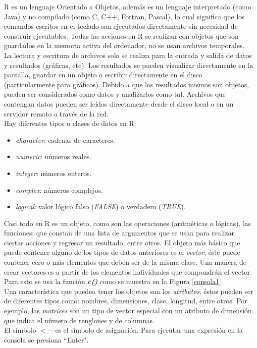 R es un lenguaje Orientado a Objetos, además es un lenguaje interpretado (como Java) y no compilado (como C, C++, Fortran, Pascal), lo cual significa que los comandos escritos en el teclado son ejecutados directamente sin necesidad de construir ejecutables. Todas las acciones en R se realizan con objetos que son guardados en la memoria activa del ordenador, no se usan archivos temporales\cite{principiantes}. La lectura y escritura de archivos solo se realiza para la entrada y salida de datos y resultados (gráficas, etc). Los resultados se pueden visualizar directamente en la pantalla, guardar en un objeto o escribir directamente en el disco (particularmente para gráficos). Debido a que los resultados mismos son objetos, pueden ser considerados como datos y analizarlos como tal. Archivos que contengan datos pueden ser leídos directamente desde el disco local o en un servidor remoto a través de la red\cite{principiantes}.\\


Hay diferentes tipos  o clases de datos en R:
\begin{itemize}
    \item \emph{character}: cadenas de caracteres.
    \item \emph{numeric}: números reales.
    \item \emph{integer}: números enteros.
    \item \emph{complex}: números complejos.
   \item \emph{logical}: valor lógico falso (\emph{FALSE}) o verdadero (\emph{TRUE}).\\
\end{itemize}

Casi todo en R es un objeto, como son las operaciones (aritméticas o lógicas), las funciones; que constan de una lista de argumentos que se usan para realizar ciertas acciones y regresar un resultado, entre otros. El objeto más básico que puede contener alguno de los tipos de datos anteriores es el \emph{vector}, éste puede contener cero o más elementos que deben ser de la misma clase. Una manera de crear vectores es a partir de los elementos individuales que compondrán el vector\cite{santana}. Para esto se usa la función \emph{\textbf{c()}} como se muestra en la Figura \ref{consola1}.  \\

Una característica que pueden tener los objetos son los \emph{atributos}, éstos pueden ser de diferentes tipos como: nombres, dimensiones, clase, longitud, entre otros. Por ejemplo, las \emph{matrices} son un tipo de vector especial con un atributo de dimensión que indica el número de renglones y de columnas.\\
El símbolo \textbf{$<-$} es el símbolo de asignación. Para ejecutar una expresión en la consola se presiona ``Enter".

